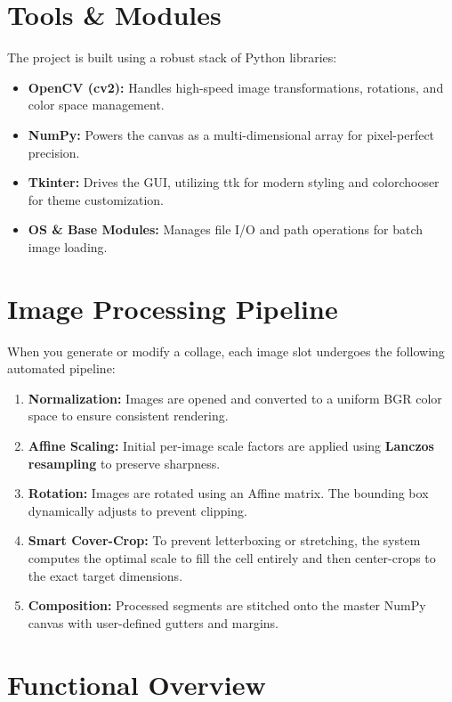 \documentclass[a4paper]{article}
\begin{document}
\section*{Tools \& Modules}
The project is built using a robust stack of Python libraries:
\begin{itemize}
    \item \textbf{OpenCV (cv2):} Handles high-speed image transformations, rotations, and color space management.
    \item \textbf{NumPy:} Powers the canvas as a multi-dimensional array for pixel-perfect precision.
    \item \textbf{Tkinter:} Drives the GUI, utilizing ttk for modern styling and colorchooser for theme customization.
    \item \textbf{OS \& Base Modules:} Manages file I/O and path operations for batch image loading.
\end{itemize}


\vspace{10pt}
\section*{Image Processing Pipeline}
When you generate or modify a collage, each image slot undergoes the following automated pipeline:
\begin{enumerate}
    \item \textbf{Normalization:} Images are opened and converted to a uniform BGR color space to ensure consistent rendering.
    \item \textbf{Affine Scaling:} Initial per-image scale factors are applied using \textbf{Lanczos resampling} to preserve sharpness.
    \item \textbf{Rotation:} Images are rotated using an Affine matrix. The bounding box dynamically adjusts to prevent clipping.
    \item \textbf{Smart Cover-Crop:} To prevent letterboxing or stretching, the system computes the optimal scale to fill the cell entirely and then center-crops to the exact target dimensions.
    \item \textbf{Composition:} Processed segments are stitched onto the master NumPy canvas with user-defined gutters and margins.
\end{enumerate}

\vspace{10pt}
\section*{Functional Overview}
\end{document}
